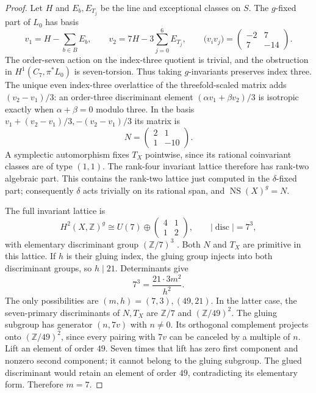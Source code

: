 \begin{proof}
Let \(H\) and \(E_b,E_{T_j}\) be the line and exceptional classes on \(S\).
The \(g\)-fixed part of \(L_0\) has basis
\[
 v_1=H-\sum_{b\in B}E_b,\qquad
 v_2=7H-3\sum_{j=0}^6E_{T_j},\qquad
 \bigl(v_iv_j\bigr)=\begin{pmatrix}-2&7\\7&-14\end{pmatrix}.
\]
The order-seven action on the index-three quotient is trivial, and
the obstruction in \(H^1(C_7,\pi^*L_0)\) is seven-torsion. Thus
taking \(g\)-invariants preserves index three.
The unique even index-three overlattice of the threefold-scaled
matrix adds \((v_2-v_1)/3\): an order-three discriminant element
\((\alpha v_1+\beta v_2)/3\) is isotropic exactly when
\(\alpha+\beta=0\) modulo three.
In the basis \(v_1+(v_2-v_1)/3,-(v_2-v_1)/3\) its matrix is
\[
 N=\begin{pmatrix}2&1\\1&-10\end{pmatrix}.
\]
A symplectic automorphism fixes \(T_X\) pointwise, since its rational
coinvariant classes are of type \((1,1)\).
The rank-four invariant lattice therefore has rank-two algebraic part.
This contains the rank-two lattice just computed in the \(\delta\)-fixed
part; consequently \(\delta\) acts trivially on its rational span, and
\(\operatorname{NS}(X)^g=N\).

The full invariant lattice is
\[
 H^2(X,\mathbb Z)^g
 \cong U(7)\oplus\begin{pmatrix}4&1\\1&2\end{pmatrix},
 \qquad |\operatorname{disc}|=7^3,
\]
with elementary discriminant group \((\mathbb Z/7)^3\)
\cite[Proposition 4.6]{geo_garbagnati_sarti2007}.
Both \(N\) and \(T_X\) are primitive in this lattice.
If \(h\) is their gluing index, the gluing group injects into both
discriminant groups, so \(h\mid21\). Determinants give
\[
 7^3=\frac{21\cdot3m^2}{h^2}.
\]
The only possibilities are \((m,h)=(7,3),(49,21)\).
In the latter case, the seven-primary discriminants of \(N,T_X\)
are \(\mathbb Z/7\) and \((\mathbb Z/49)^2\). The gluing subgroup
has generator \((n,7v)\) with \(n\ne0\).
Its orthogonal complement projects onto \((\mathbb Z/49)^2\),
since every pairing with \(7v\) can be canceled by a multiple of \(n\).
Lift an element of order \(49\). Seven times that lift has zero first
component and nonzero second component; it cannot belong to the
gluing subgroup. The glued discriminant would retain an element of
order \(49\), contradicting its elementary form. Therefore \(m=7\).
\end{proof}

